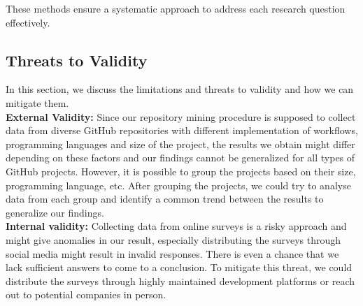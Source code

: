 \documentclass[conference]{IEEEtran}
\begin{document}
        These methods ensure a systematic approach to address each research question effectively.\\

    \subsection{Threats to Validity}
        In this section, we discuss the limitations and threats to
        validity and how we can mitigate them.\\

        \textbf{External Validity:} Since our repository mining procedure is supposed to collect data from diverse GitHub repositories with different implementation of workflows, programming languages and size of the project, the results we obtain might differ depending on these factors and our findings cannot be generalized for all types of GitHub projects. However, it is possible to group the projects based on their size, programming language, etc. After grouping the projects, we could try to analyse data from each group and identify a common trend between the results to generalize our findings.\\

        \textbf{Internal validity:} Collecting data from online surveys is a risky approach and might give anomalies in our result, especially distributing the surveys through social media might result in invalid responses. There is even a chance that we lack sufficient answers to come to a conclusion. To mitigate this threat, we could distribute the surveys through highly maintained development platforms or reach out to potential companies in person. 






\vspace{12pt}
\end{document}

